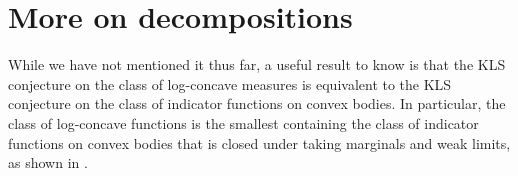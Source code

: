 \documentclass{article}
\begin{document}





\section{More on decompositions}

	While we have not mentioned it thus far, a useful result to know is that the KLS conjecture on the class of log-concave measures is equivalent to the KLS conjecture on the class of indicator functions on convex bodies. In particular, the class of log-concave functions is the smallest containing the class of indicator functions on convex bodies that is closed under taking marginals and weak limits, as shown in \cite{AlonsoGutirrez2015}.
\end{document}
